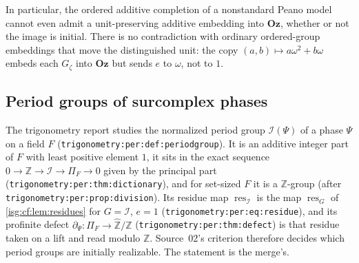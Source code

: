 \documentclass[11pt]{article}
\theoremstyle{definition}
\theoremstyle{remark}
\newcommand{\Oz}{\ensuremath{\mathbf{Oz}}}
\newcommand{\Z}{\mathbb{Z}}
\newcommand{\Zhat}{\widehat{\Z}}
\newcommand{\res}{\operatorname{res}}
\newcommand{\replabel}[1]{\nolinkurl{#1}}
\begin{document}
In particular, the ordered additive completion of a nonstandard Peano
model cannot even admit a unit-preserving additive embedding into
$\Oz$, whether or not the image is initial. There is no contradiction
with ordinary ordered-group embeddings that move the distinguished
unit: the copy $(a,b)\mapsto a\omega^2+b\omega$ embeds each
$G_\zeta$ into $\Oz$ but sends $e$ to $\omega$, not to $1$.

\subsection{Period groups of surcomplex phases}\label{isg:cf:sec:periods}
The trigonometry report studies the normalized period group
$\mathcal I(\Psi)$ of a phase $\Psi$ on a field $F$
(\replabel{trigonometry:per:def:periodgroup}). It is an additive integer
part of $F$ with least positive element $1$, it sits in the exact
sequence $0\to\Z\to\mathcal I\to\Pi_F\to0$ given by the principal part
(\replabel{trigonometry:per:thm:dictionary}), and for set-sized $F$ it is
a $\Z$-group (after \replabel{trigonometry:per:prop:division}). Its
residue map $\res_{\mathcal I}$ is the map $\res_G$ of
\cref{isg:cf:lem:residues} for $G=\mathcal I$, $e=1$
(\replabel{trigonometry:per:eq:residue}), and its profinite defect
$\partial_\Psi:\Pi_F\to\Zhat/\Z$
(\replabel{trigonometry:per:thm:defect}) is that residue taken on a lift
and read modulo $\Z$. Source~02's criterion therefore decides which
period groups are initially realizable. The statement is the merge's.
\end{document}

